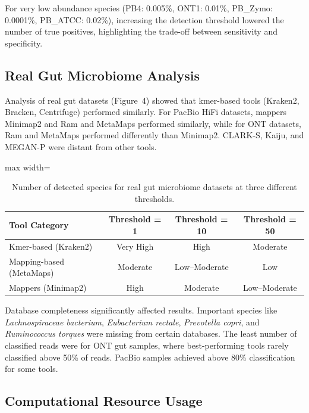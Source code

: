 \documentclass{article}
\begin{document}
For very low abundance species (PB4: 0.005\%, ONT1: 0.01\%, PB\_Zymo: 0.0001\%, PB\_ATCC: 0.02\%), increasing the detection threshold lowered the number of true positives, highlighting the trade-off between sensitivity and specificity.

\subsection{Real Gut Microbiome Analysis}

Analysis of real gut datasets (Figure~4) showed that kmer-based tools (Kraken2, Bracken, Centrifuge) performed similarly. For PacBio HiFi datasets, mappers Minimap2 and Ram and MetaMaps performed similarly, while for ONT datasets, Ram and MetaMaps performed differently than Minimap2. CLARK-S, Kaiju, and MEGAN-P were distant from other tools.

\begin{table}[htbp]
\centering
\caption{Number of detected species for real gut microbiome datasets at three different thresholds.}
\label{tab:real_gut}
\begin{adjustbox}{max width=\textwidth}
\begin{tabular}{lccc}
\toprule
Tool Category & Threshold = 1 & Threshold = 10 & Threshold = 50 \\
\midrule
Kmer-based (Kraken2) & Very High & High & Moderate \\
Mapping-based (MetaMaps) & Moderate & Low--Moderate & Low \\
Mappers (Minimap2) & High & Moderate & Low--Moderate \\
\bottomrule
\end{tabular}
\end{adjustbox}
\end{table}

Database completeness significantly affected results. Important species like \textit{Lachnospiraceae bacterium}, \textit{Eubacterium rectale}, \textit{Prevotella copri}, and \textit{Ruminococcus torques} were missing from certain databases. The least number of classified reads were for ONT gut samples, where best-performing tools rarely classified above 50\% of reads. PacBio samples achieved above 80\% classification for some tools.

\subsection{Computational Resource Usage}
\end{document}
